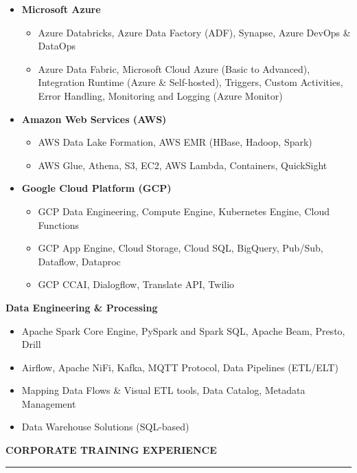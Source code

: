 \documentclass[a4paper]{article}
\begin{document}
\begin{itemize}
\item
  \textbf{Microsoft Azure}

  \begin{itemize}
  \item
    Azure Databricks, Azure Data Factory (ADF), Synapse, Azure DevOps \&
    DataOps
  \item
    Azure Data Fabric, Microsoft Cloud Azure (Basic to Advanced),
    Integration Runtime (Azure \& Self-hosted), Triggers, Custom
    Activities, Error Handling, Monitoring and Logging (Azure Monitor)
  \end{itemize}
\item
  \textbf{Amazon Web Services (AWS)}

  \begin{itemize}
  \item
    AWS Data Lake Formation, AWS EMR (HBase, Hadoop, Spark)
  \item
    AWS Glue, Athena, S3, EC2, AWS Lambda, Containers, QuickSight
  \end{itemize}
\item
  \textbf{Google Cloud Platform (GCP)}

  \begin{itemize}
  \item
    GCP Data Engineering, Compute Engine, Kubernetes Engine, Cloud
    Functions
  \item
    GCP App Engine, Cloud Storage, Cloud SQL, BigQuery, Pub/Sub,
    Dataflow, Dataproc
  \item
    GCP CCAI, Dialogflow, Translate API, Twilio
  \end{itemize}
\end{itemize}

\textbf{Data Engineering \& Processing}

\begin{itemize}
\item
  Apache Spark Core Engine, PySpark and Spark SQL, Apache Beam, Presto,
  Drill
\item
  Airflow, Apache NiFi, Kafka, MQTT Protocol, Data Pipelines (ETL/ELT)
\item
  Mapping Data Flows \& Visual ETL tools, Data Catalog, Metadata
  Management
\item
  Data Warehouse Solutions (SQL-based)
\end{itemize}



\begin{center}
  \textbf{CORPORATE TRAINING EXPERIENCE}
  \rule{\textwidth}{0.4pt}  %
\end{center}
\end{document}
